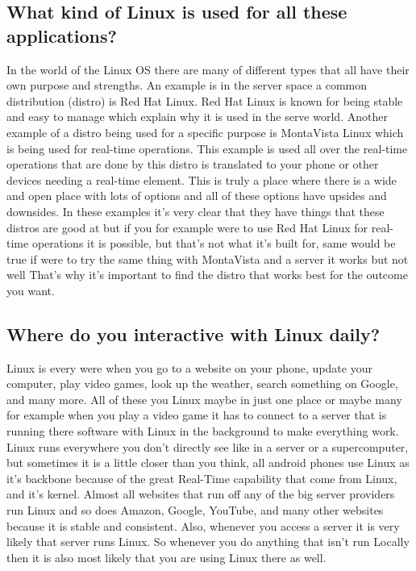 \documentclass{article}
\begin{document}
\subsection{What kind of Linux is used for all these applications?}
In the world of the Linux OS there are many of different types that all have their own purpose and strengths.
An example is in the server space a common distribution (distro) is Red Hat Linux.
Red Hat Linux is known for being stable and easy to manage which explain why it is used in the serve world.
Another example of a distro being used for a specific purpose is MontaVista Linux which is being used for real-time operations.
This example is used all over the real-time operations that are done by this distro is translated to your phone or other devices needing a real-time element.
This is truly a place where there is a wide and open place with lots of options and all of these options have upsides and downsides.
In these examples it's very clear that they have things that these distros are good at but if you for example were to use Red Hat Linux for real-time operations it is possible, but that's not what it's built for, same would be true if were to try the same thing with MontaVista and a server it works but not well
That's why it's important to find the distro that works best for the outcome you want.
\subsection{Where do you interactive with Linux daily?}
Linux is every were when you go to a website on your phone, update your computer, play video games, look up the weather, search something on Google, and many more.
All of these you Linux maybe in just one place or maybe many for example when you play a video game it has to connect to a server that is running there software with Linux in the background to make everything work.
Linux runs everywhere you don't directly see like in a server or a supercomputer, but sometimes it is a little closer than you think, all android phones use Linux as it's backbone because of the great Real-Time capability that come from Linux, and it's kernel.
Almost all websites that run off any of the big server providers run Linux and so does Amazon, Google, YouTube, and many other websites because it is stable and consistent.
Also, whenever you access a server it is very likely that server runs Linux.
So whenever you do anything that isn't run Locally then it is also most likely that you are using Linux there as well.
\end{document}
